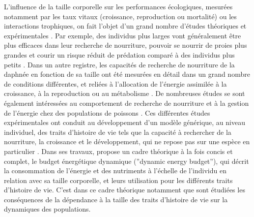 L'influence de la taille corporelle sur les performances écologiques, mesurées
notamment par les taux vitaux (croissance, reproduction ou mortalité) ou les
interactions trophiques, on fait l'objet d'un grand nombre d'études théoriques
et expérimentales
\autocite[][\ldots]{peters1986a,calder1996a,de-roos2001a,claessen2004a}. Par
exemple, des individus plus larges vont généralement être plus efficaces dans
leur recherche de nourriture, pouvoir se nourrir de proies plus grandes et
courir un risque réduit de prédation comparé à des individus plus petits
\autocite{paradis1996a}.
Dans un autre registre, les capacités de recherche de nourriture de la daphnée
en fonction de sa taille ont été mesurées en détail dans un grand nombre de
conditions différentes, et reliées à l'allocation de l'énergie assimilée à la
croissance, à la reproduction ou au métabolisme \autocite[par ex.
][]{lampert1978a,gurney1990a,mccauley1990a,kooijman2000a}. De nombreuses études
se sont également intéressées au comportement de recherche de nourriture et à la
gestion de l'énergie chez des populations de poissons \autocite[par ex.
][]{elliott1975a,mittelbach1981a,fuiman1994a,hjelm2001a}. Ces différentes études
expérimentales ont conduit au développement d'un modèle générique, au niveau
individuel, des traits d'histoire de vie tels que la capacité à rechercher de la
nourriture, la croissance et le développement, qui ne repose pas sur une espèce
en particulier \autocite{kooijman2000a,nisbet2000a,west2001a}. Dans ses travaux,
\textcite{kooijman2000a} propose un cadre théorique à la fois concis et
complet, le budget énergétique dynamique (''dynamic energy budget''), qui décrit
la consommation  de l'énergie et des nutriments à l'échelle de l'individu en
relation avec sa taille corporelle, et leurs utilisation pour les différents
traits d'histoire de vie. C'est dans ce cadre théorique notamment que sont
étudiées les conséquences de la dépendance à la taille des traits d'histoire de
vie sur la dynamiques des populations.

